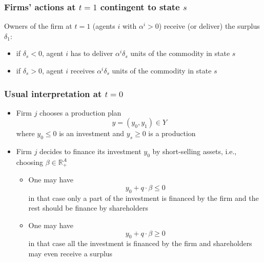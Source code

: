 \documentclass[blue]{beamer}
\def\R{\mathbb{R}}
\def\leq{\leqslant}
\def\geq{\geqslant}
\theoremstyle{definition}
\theoremstyle{example}
\begin{document}

\begin{frame}\frametitle{Firms' actions at $t=1$ contingent to state $s$}

Owners of the firm at $t=1$ (agents $i$ with $\alpha^i >0$) receive (or deliver) the surplus $\delta_1$:
    \begin{itemize}
    \item if $\delta_s <0$, agent $i$ has to deliver $\alpha^i \delta_s$ units of the commodity in state $s$
    \item if $\delta_s > 0$, agent $i$ receives $\alpha^i \delta_s$ units of the commodity in state $s$
    \end{itemize}

\end{frame}


\begin{frame}\frametitle{Usual interpretation at $t=0$}

\begin{itemize}
\item Firm $j$ chooses a production plan $$y=(y_0,y_1) \in Y$$ where $y_0 \leq 0$ is an investment and $y_s \geq 0$ is a production
\item Firm $j$ decides to finance its investment $y_0$ by short-selling assets, i.e., choosing $\beta \in \R^A_+$
    \begin{itemize}
    \item One may have
    \[
    y_0 + q \cdot \beta \leq 0
    \]
    in that case only a part of the investment is financed by the firm and the rest should be finance by shareholders
    \item One may have
    \[
    y_0 + q \cdot \beta \geq 0
    \]
    in that case all the investment is financed by the firm and shareholders may even receive a surplus
    \end{itemize}
\end{itemize}

\end{frame}


\end{document}
